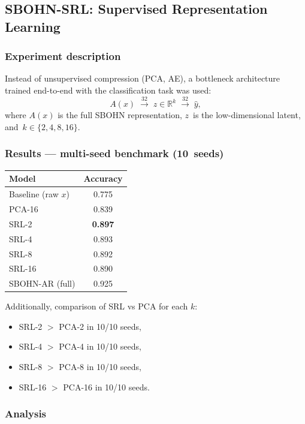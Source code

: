 \subsection{SBOHN-SRL: Supervised Representation Learning}

\subsubsection{Experiment description}

Instead of unsupervised compression (PCA, AE), a bottleneck architecture trained end-to-end with the classification task was used:
\[
A(x) \;\xrightarrow{\text{32}}\; z \in \mathbb{R}^k \;\xrightarrow{\text{32}}\; \hat{y},
\]
where $A(x)$ is the full SBOHN representation, $z$~is the low-dimensional latent, and~$k\in\{2,4,8,16\}$.

\subsubsection{Results --- multi-seed benchmark (10~seeds)}

\begin{center}
\begin{tabular}{lc}
\toprule
Model & Accuracy \\
\midrule
Baseline (raw $x$) & 0.775 \\
PCA-16 & 0.839 \\
SRL-2 & \textbf{0.897} \\
SRL-4 & 0.893 \\
SRL-8 & 0.892 \\
SRL-16 & 0.890 \\
SBOHN-AR (full) & 0.925 \\
\bottomrule
\end{tabular}
\end{center}

Additionally, comparison of SRL vs PCA for each $k$:
\begin{itemize}
\item SRL-2 $>$ PCA-2 in 10/10 seeds,
\item SRL-4 $>$ PCA-4 in 10/10 seeds,
\item SRL-8 $>$ PCA-8 in 10/10 seeds,
\item SRL-16 $>$ PCA-16 in 10/10 seeds.
\end{itemize}

\subsubsection{Analysis}


